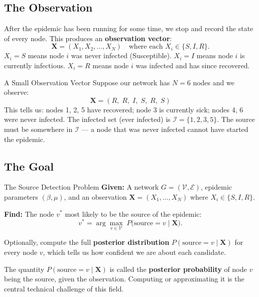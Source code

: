 \subsection{The Observation}

After the epidemic has been running for some time, we stop and record the
state of every node. This produces an \textbf{observation vector}:
\[
    \mathbf{X} = (X_1, X_2, \ldots, X_N)
    \quad \text{where each } X_i \in \{S, I, R\}.
\]
$X_i = S$ means node $i$ was never infected (Susceptible). $X_i = I$ means
node $i$ is currently infectious. $X_i = R$ means node $i$ was infected and
has since recovered.

\begin{examplebox}{A Small Observation Vector}
Suppose our network has $N = 6$ nodes and we observe:
\[
    \mathbf{X} = (R,\; R,\; I,\; S,\; R,\; S)
\]
This tells us: nodes 1, 2, 5 have recovered; node 3 is currently sick; nodes
4, 6 were never infected. The infected set (ever infected) is
$\mathcal{I} = \{1, 2, 3, 5\}$. The source must be somewhere in
$\mathcal{I}$ — a node that was never infected cannot have started the
epidemic.
\end{examplebox}

\subsection{The Goal}

\begin{mathbox}{The Source Detection Problem}
\textbf{Given:} A network $G = (\mathcal{V}, \mathcal{E})$, epidemic
parameters $(\beta, \mu)$, and an observation
$\mathbf{X} = (X_1, \ldots, X_N)$ where $X_i \in \{S, I, R\}$.

\textbf{Find:} The node $v^*$ most likely to be the source of the epidemic:
\begin{equation}
    v^* = \arg\max_{v \in \mathcal{V}} \; P\bigl(\text{source} = v \;\big|\; \mathbf{X}\bigr).
    \label{eq:map-estimate}
\end{equation}

Optionally, compute the full \textbf{posterior distribution}
$P(\text{source} = v \mid \mathbf{X})$ for every node $v$, which tells
us how confident we are about each candidate.
\end{mathbox}

The quantity $P(\text{source} = v \mid \mathbf{X})$ is called the
\textbf{posterior probability} of node $v$ being the source, given the
observation. Computing or approximating it is the central technical challenge
of this field.


